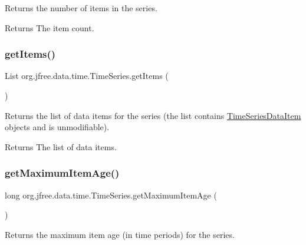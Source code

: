 Returns the number of items in the series.

\begin{DoxyReturn}{Returns}
The item count. 
\end{DoxyReturn}
\mbox{\label{classorg_1_1jfree_1_1data_1_1time_1_1_time_series_aa25a696d3ad0b3e9d7aa85733e56caa5}} 
\subsubsection{\texorpdfstring{get\+Items()}{getItems()}}
{\footnotesize\ttfamily List org.\+jfree.\+data.\+time.\+Time\+Series.\+get\+Items (\begin{DoxyParamCaption}{ }\end{DoxyParamCaption})}

Returns the list of data items for the series (the list contains \mbox{\hyperlink{classorg_1_1jfree_1_1data_1_1time_1_1_time_series_data_item}{Time\+Series\+Data\+Item}} objects and is unmodifiable).

\begin{DoxyReturn}{Returns}
The list of data items. 
\end{DoxyReturn}
\mbox{\label{classorg_1_1jfree_1_1data_1_1time_1_1_time_series_a354525b3ed2463cc3ea0fd998bc91faa}} 
\subsubsection{\texorpdfstring{get\+Maximum\+Item\+Age()}{getMaximumItemAge()}}
{\footnotesize\ttfamily long org.\+jfree.\+data.\+time.\+Time\+Series.\+get\+Maximum\+Item\+Age (\begin{DoxyParamCaption}{ }\end{DoxyParamCaption})}

Returns the maximum item age (in time periods) for the series.

